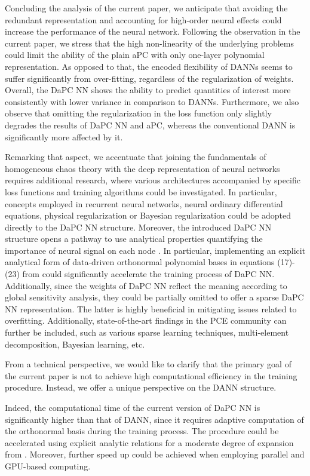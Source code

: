 \documentclass[a4paper,fleqn]{article}
\newcommand{\rw}[1]{\textcolor{blue}{#1}}
\newcommand{\del}[1]{\textcolor{red}{\sout{#1}}}
\renewcommand{\del}[1]{}
\renewcommand{\rw}[1]{#1}
\begin{document}
Concluding the analysis \rw{of} the current paper, we anticipate that avoiding the redundant representation and accounting for high-order neural effects could increase the performance of the neural network. Following the observation in the current paper, we stress that the high non-linearity of the underlying problems could limit the ability of the plain aPC with only one-layer polynomial representation. As opposed to that, the encoded flexibility of DANNs seems to suffer significantly from over-fitting, regardless of the regularization of weights. Overall, the DaPC NN shows \rw{the} ability to predict quantities of interest more consistently with lower variance in comparison to DANNs. Furthermore, we also observe that omitting the regularization in the loss function only slightly degrades the results of DaPC NN and aPC, whereas the conventional DANN is significantly more affected by it. 

Remarking that aspect, we accentuate that joining the fundamentals of homogeneous chaos theory with the deep representation of neural networks requires additional research, where various architectures accompanied by specific loss functions and training algorithms could be \rw{investigated.} \del{incorporated.} In particular, concepts employed in recurrent neural networks, neural ordinary differential equations, physical regularization or Bayesian regularization could be adopted directly to the DaPC NN structure. Moreover, the introduced DaPC NN structure opens a pathway to use analytical properties quantifying the importance of neural signal on each node \del{(e.g. sensitivity indices)}. \rw{In particular, implementing an explicit analytical form of data-driven orthonormal polynomial bases in equations (17)-(23) from \cite{OladNowak_RESS2012} could significantly accelerate the training process of DaPC NN. Additionally, since the weights of DaPC NN reflect the meaning according to global sensitivity analysis, they could be partially omitted \cite{burkner2022sparse} to offer a sparse DaPC NN representation. The latter is highly beneficial in mitigating issues related to overfitting.} Additionally, state-of-the-art findings in the PCE community can further be included, such as various sparse learning techniques, multi-element decomposition, Bayesian learning, etc. 

\rw{From a technical perspective, we would like to clarify that the primary goal of the current paper is not to achieve high computational efficiency in the training procedure. Instead, we offer a unique perspective on the DANN structure.}
\del{From a technical point of view, we would like to note that the current paper does not aim to achieve high computational efficiency of training procedure itself offering a first look at the DANN structure from a different angle.}
Indeed, the computational time of the current version of DaPC NN is significantly higher than that of DANN, since it requires adaptive computation of the orthonormal basis during the training process. The procedure could be accelerated using explicit analytic relations for a moderate degree of expansion from \cite{OladNowak_RESS2012}. Moreover, further speed up could be achieved when employing parallel and GPU-based computing. 
\end{document}
